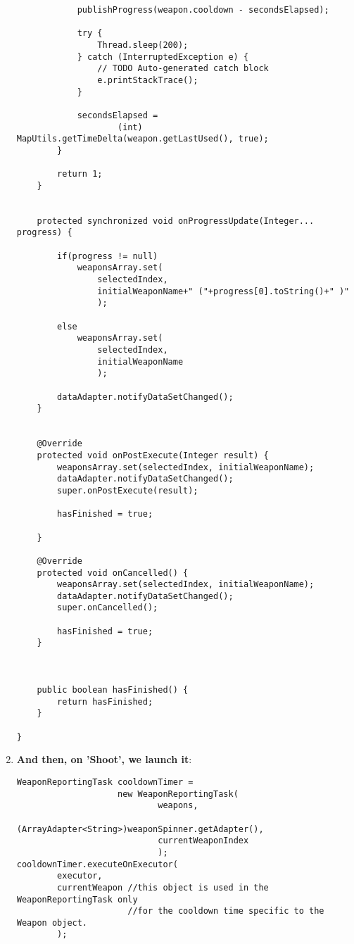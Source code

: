 \begin{enumerate}
\begin{verbatim}
 			publishProgress(weapon.cooldown - secondsElapsed);
 			
 			try {
				Thread.sleep(200);
			} catch (InterruptedException e) {
				// TODO Auto-generated catch block
				e.printStackTrace();
			}
 			
 			secondsElapsed = 
 					(int) MapUtils.getTimeDelta(weapon.getLastUsed(), true);
 		}
 		
 		return 1;
 	}
     
    
    protected synchronized void onProgressUpdate(Integer... progress) {
    	
    	if(progress != null)
    		weaponsArray.set(
    			selectedIndex, 
    			initialWeaponName+" ("+progress[0].toString()+" )"
    			);
    	
    	else 
    		weaponsArray.set(
    			selectedIndex, 
    			initialWeaponName
    			);
    	
    	dataAdapter.notifyDataSetChanged();
    }

    
    @Override
    protected void onPostExecute(Integer result) {
    	weaponsArray.set(selectedIndex, initialWeaponName);
    	dataAdapter.notifyDataSetChanged();    	
    	super.onPostExecute(result);
    	
    	hasFinished = true;
    	
    }
    
    @Override
    protected void onCancelled() {
    	weaponsArray.set(selectedIndex, initialWeaponName);
    	dataAdapter.notifyDataSetChanged();
    	super.onCancelled();
    	
    	hasFinished = true;
    }



	public boolean hasFinished() {
		return hasFinished;
	}
    
}

\end{verbatim}

  \item \textbf{And then, on 'Shoot', we launch it}:

\begin{verbatim}
WeaponReportingTask cooldownTimer = 
					new WeaponReportingTask(
							weapons,
							(ArrayAdapter<String>)weaponSpinner.getAdapter(),
							currentWeaponIndex
							);
cooldownTimer.executeOnExecutor(
		executor,
		currentWeapon //this object is used in the WeaponReportingTask only  
					  //for the cooldown time specific to the Weapon object.
		);
\end{verbatim}


\end{enumerate}

